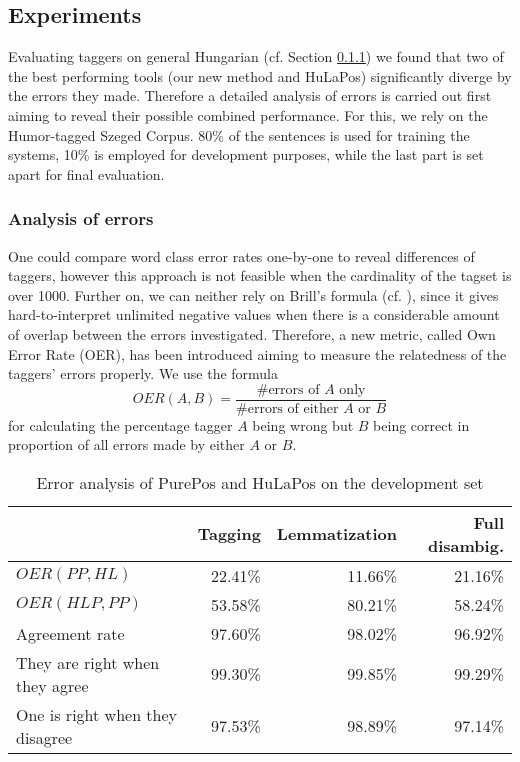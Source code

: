 \subsection{Experiments}

Evaluating taggers on general Hungarian (cf. Section \ref{}) we found that two of the best performing tools (our new method and HuLaPos) significantly diverge by the errors they made. Therefore a detailed analysis of errors is carried out first aiming to reveal their possible combined performance. For this, we rely on the Humor-tagged Szeged Corpus. 80\% of the sentences is used for training the systems, 10\%  is employed for development purposes, while the last part is set apart for final evaluation.

\subsubsection{Analysis of errors}

One could compare word class error rates one-by-one to reveal differences of taggers, however this approach is not feasible when the cardinality of the tagset is over 1000. 
Further on, we can neither rely on Brill's formula (cf. \cite{Brill1998}), since it gives hard-to-interpret unlimited negative values when there is a considerable amount of overlap between the errors investigated. 
Therefore, a new metric, called Own Error Rate (OER), has been introduced aiming to measure the relatedness of the taggers' errors properly.
We use the formula 
\begin{equation}
OER(A,B)=\frac{\text{\#errors of }A\text{ only}}{\text{\#errors of either }A\text{ or }B}
\end{equation}
for calculating the percentage tagger $A$ being wrong but $B$ being correct in proportion of all errors made by either $A$ or $B$.


\begin{table}[h]
\centering
\caption{Error analysis of PurePos and HuLaPos on the development set}\label{tab:disambig-comp}
\begin{tabular}{l r r r}
\hline
& Tagging & Lemmatization & Full disambig. \\
\hline
$OER(PP, HL)$ & 22.41\% & 11.66\% & 21.16\% \\ %
$OER(HLP, PP)$ & 53.58\% & 80.21\% & 58.24\% \\
Agreement rate & 97.60\% & 98.02\% & 96.92\% \\
They are right when they agree & 99.30\% & 99.85\% & 99.29\% \\
One is right when they disagree & 97.53\% & 98.89\% & 97.14\% \\
\hline
\end{tabular}
\end{table}

